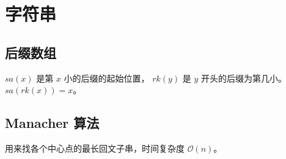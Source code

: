 \section{字符串}

\subsection{后缀数组}

$sa(x)$ 是第 $x$ 小的后缀的起始位置，
$rk(y)$ 是 $y$ 开头的后缀为第几小。
$sa(rk(x)) = x$。



\subsection{Manacher 算法}

用来找各个中心点的最长回文子串，时间复杂度 $\mathcal{O}(n)$。


